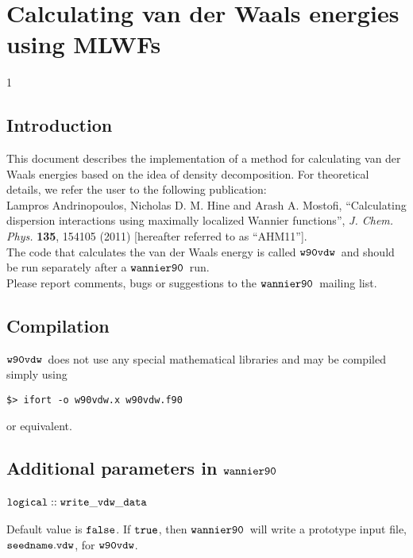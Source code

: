 \documentclass{report}
\newcommand{\wvdw}{{$\tt{w90vdw}$}}
\newcommand{\wannier}{{$\tt{wannier90}$}}
\begin{document}
\normalsize

\chapter*{Calculating van der Waals energies using MLWFs}
\addtocounter {chapter} {1}

\section{Introduction}

This document describes the implementation of a method for calculating
van der Waals energies based on the idea of density decomposition. For
theoretical details, we refer the user to the following publication:\\

Lampros Andrinopoulos, Nicholas D. M. Hine and Arash A. Mostofi,
``Calculating dispersion interactions using maximally localized Wannier functions'',
\emph{J. Chem. Phys.} \textbf{135}, 154105 (2011) [hereafter referred
to as ``AHM11'']. \\

The code that calculates the van der Waals energy is called
\wvdw\ and should be run separately after a \wannier\ run.\\

Please report comments, bugs or suggestions to the \wannier\ mailing
list. 

\section{Compilation}

\wvdw\ does not use any special mathematical libraries and may be
compiled simply using

\begin{verbatim}
$> ifort -o w90vdw.x w90vdw.f90
\end{verbatim}

or equivalent.

\section{Additional parameters in \wannier}

\subsection{$\tt{logical :: write\_vdw\_data}$}
 
Default value is $\tt{false}$. If $\tt{true}$, then \wannier\ will
write a prototype input file, $\tt{seedname.vdw}$, for
\wvdw. 
\end{document}
